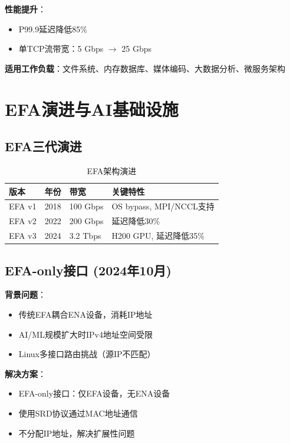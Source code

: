 \textbf{性能提升}：
\begin{itemize}
    \item P99.9延迟降低85\%
    \item 单TCP流带宽：5 Gbps $\rightarrow$ 25 Gbps
\end{itemize}

\textbf{适用工作负载}：文件系统、内存数据库、媒体编码、大数据分析、微服务架构

\section{EFA演进与AI基础设施}

\subsection{EFA三代演进}

\begin{table}[htbp]
\centering
\caption{EFA架构演进}
\begin{tabular}{@{}llll@{}}
\toprule
\textbf{版本} & \textbf{年份} & \textbf{带宽} & \textbf{关键特性} \\
\midrule
EFA v1 & 2018 & 100 Gbps & OS bypass, MPI/NCCL支持 \\
EFA v2 & 2022 & 200 Gbps & 延迟降低30\% \\
EFA v3 & 2024 & 3.2 Tbps & H200 GPU, 延迟降低35\% \\
\bottomrule
\end{tabular}
\end{table}

\subsection{EFA-only接口 (2024年10月)}

\textbf{背景问题}：
\begin{itemize}
    \item 传统EFA耦合ENA设备，消耗IP地址
    \item AI/ML规模扩大时IPv4地址空间受限
    \item Linux多接口路由挑战（源IP不匹配）
\end{itemize}

\textbf{解决方案}：
\begin{itemize}
    \item EFA-only接口：仅EFA设备，无ENA设备
    \item 使用SRD协议通过MAC地址通信
    \item 不分配IP地址，解决扩展性问题
\end{itemize}

